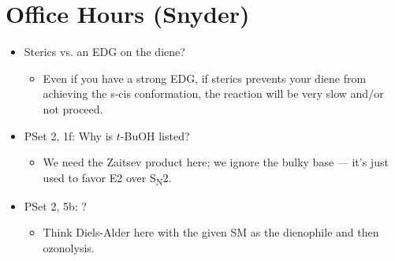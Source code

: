 \documentclass[../notes.tex]{subfiles}
\begin{document}
\section{Office Hours (Snyder)}
\begin{itemize}
    \item {}Sterics vs. an EDG on the diene?
    \begin{center}
        \footnotesize
    \end{center}
    \begin{itemize}
        \item Even if you have a strong EDG, if sterics prevents your diene from achieving the s-cis conformation, the reaction will be very slow and/or not proceed.
    \end{itemize}
    \item PSet 2, 1f: Why is $t$-BuOH listed?
    \begin{itemize}
        \item We need the Zaitsev product here; we ignore the bulky base --- it's just used to favor E2 over S\textsubscript{N}2.
    \end{itemize}
    \item PSet 2, 5b: ?
    \begin{itemize}
        \item Think Diels-Alder here with the given SM as the dienophile and then ozonolysis.
    \end{itemize}
\end{itemize}
\end{document}
